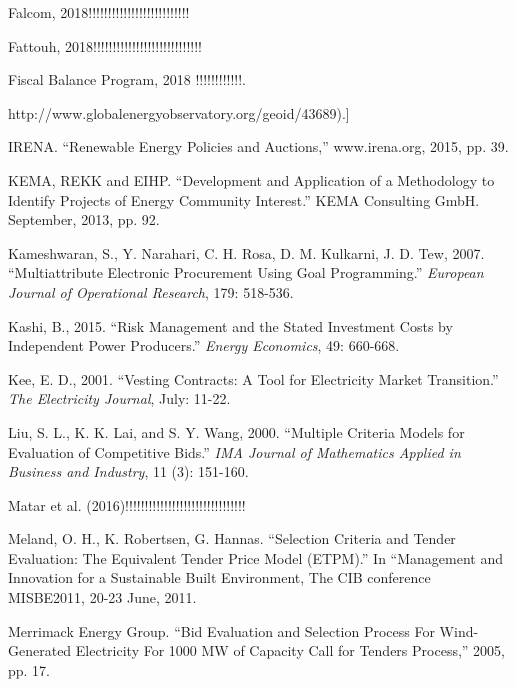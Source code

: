 \documentclass[informs]{informs3}
\begin{document}
\begin{thebibliography}{}
Falcom, 2018!!!!!!!!!!!!!!!!!!!!!!!!!!

Fattouh, 2018!!!!!!!!!!!!!!!!!!!!!!!!!!!!

Fiscal Balance Program, 2018  !!!!!!!!!!!!.	

\bibitem[{Gloabl Energy Observatory (2018)}[GEO] http://www.globalenergyobservatory.org/geoid/43689).]

IRENA. “Renewable Energy Policies and Auctions,” www.irena.org, 2015, pp. 39.

KEMA, REKK and EIHP. “Development and Application of a Methodology to Identify Projects of Energy Community Interest.” KEMA Consulting GmbH.  September, 2013, pp. 92. 

Kameshwaran, S., Y. Narahari, C. H. Rosa, D. M. Kulkarni, J. D. Tew, 2007. “Multiattribute Electronic Procurement Using Goal Programming.” \textit{European Journal of Operational Research}, 179: 518-536.

Kashi, B., 2015. “Risk Management and the Stated Investment Costs by Independent Power Producers.” \textit{Energy Economics}, 49: 660-668. 

Kee, E. D., 2001. “Vesting Contracts: A Tool for Electricity Market Transition.” \textit{The Electricity Journal}, July: 11-22. 

Liu, S. L., K. K. Lai, and S. Y. Wang, 2000. “Multiple Criteria Models for Evaluation of Competitive Bids.” \textit{IMA Journal of Mathematics Applied in Business and Industry}, 11 (3): 151-160.


Matar et al. (2016)!!!!!!!!!!!!!!!!!!!!!!!!!!!!!!!


Meland, O. H., K. Robertsen, G. Hannas. “Selection Criteria and Tender Evaluation: The Equivalent Tender Price Model (ETPM).” In “Management and Innovation for a Sustainable Built Environment, The CIB conference MISBE2011, 20-23 June, 2011. 

Merrimack Energy Group. “Bid Evaluation and Selection Process For Wind-Generated Electricity For 1000 MW of Capacity Call for Tenders Process,” 2005, pp. 17.


\end{thebibliography}
\end{document}
